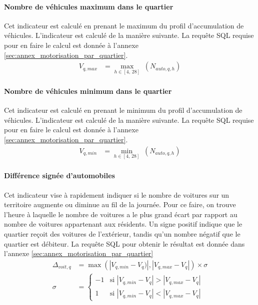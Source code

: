             \paragraph{Nombre de véhicules maximum dans le quartier} Cet indicateur est calculé en prenant le maximum du profil d'accumulation de véhicules. L'indicateur est calculé de la manière suivante. La requête SQL requise pour en faire le calcul est donnée à l'annexe \ref{sec:annex_motorisation_par_quartier}.
            \begin{align}
                V_{q,max} &= \max_{h \in [4,\,28]} \;\left(N_{auto,q,h}\right)  \label{eq:nb-voit-max}
            \end{align}
            \paragraph{Nombre de véhicules minimum dans le quartier} Cet indicateur est calculé en prenant le minimum du profil d'accumulation de véhicules. L'indicateur est calculé de la manière suivante. La requête SQL requise pour en faire le calcul est donnée à l'annexe \ref{sec:annex_motorisation_par_quartier}.
            \begin{align}
                V_{q,min} &= \min_{h \in [4,\,28]} \;\left(N_{auto,q,h}\right)
            \end{align}
            \paragraph{Différence signée d'automobiles}
            Cet indicateur vise à rapidement indiquer si le nombre de voitures sur un territoire augmente ou diminue au fil de la journée. Pour ce faire, on trouve l'heure à laquelle le nombre de voitures a le plus grand écart par rapport au nombre de voitures appartenant aux résidents. Un signe positif indique que le quartier reçoit des voitures de l'extérieur, tandis qu'un nombre négatif que le quartier est débiteur. La requête SQL pour obtenir le résultat est donnée dans l'annexe \ref{sec:annex_motorisation_par_quartier}
            \begin{align}
                \Delta_{voit,q} &= \max(|V_{q,min}-V_q)|,|V_{q,max} - V_q|) \times \sigma \label{eq:nb-voit-delta}\\
                \sigma &= 
                \begin{cases}
                    -1 & \text{si } |V_{q,min} - V_q| > |V_{q,max}- V_q| \\
                    1 & \text{si } |V_{q,min} - V_q| < |V_{q,max}- V_q|
                \end{cases}
            \end{align}
